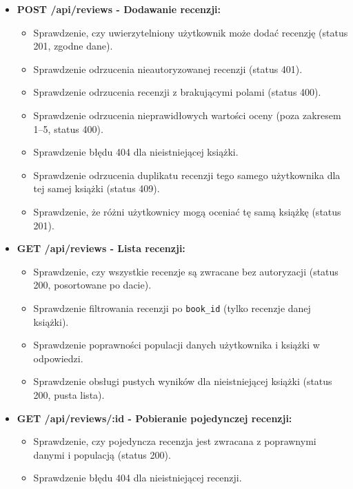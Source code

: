 \documentclass{article}
\begin{document}
\begin{itemize}
    \item \textbf{POST /api/reviews - Dodawanie recenzji:}
    \begin{itemize}
        \item Sprawdzenie, czy uwierzytelniony użytkownik może dodać recenzję (status 201, zgodne dane).
        \item Sprawdzenie odrzucenia nieautoryzowanej recenzji (status 401).
        \item Sprawdzenie odrzucenia recenzji z brakującymi polami (status 400).
        \item Sprawdzenie odrzucenia nieprawidłowych wartości oceny (poza zakresem 1–5, status 400).
        \item Sprawdzenie błędu 404 dla nieistniejącej książki.
        \item Sprawdzenie odrzucenia duplikatu recenzji tego samego użytkownika dla tej samej książki (status 409).
        \item Sprawdzenie, że różni użytkownicy mogą oceniać tę samą książkę (status 201).
    \end{itemize}

    \item \textbf{GET /api/reviews - Lista recenzji:}
    \begin{itemize}
        \item Sprawdzenie, czy wszystkie recenzje są zwracane bez autoryzacji (status 200, posortowane po dacie).
        \item Sprawdzenie filtrowania recenzji po \texttt{book\_id} (tylko recenzje danej książki).
        \item Sprawdzenie poprawności populacji danych użytkownika i książki w odpowiedzi.
        \item Sprawdzenie obsługi pustych wyników dla nieistniejącej książki (status 200, pusta lista).
    \end{itemize}

    \item \textbf{GET /api/reviews/:id - Pobieranie pojedynczej recenzji:}
    \begin{itemize}
        \item Sprawdzenie, czy pojedyncza recenzja jest zwracana z poprawnymi danymi i populacją (status 200).
        \item Sprawdzenie błędu 404 dla nieistniejącej recenzji.
    \end{itemize}


\end{itemize}
\end{document}
